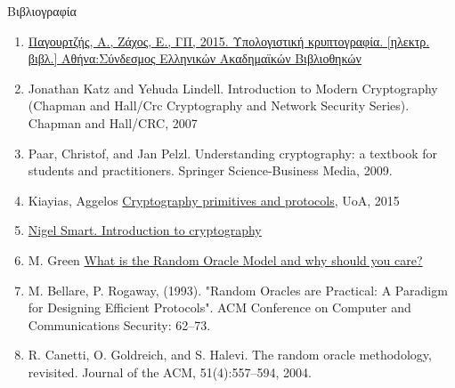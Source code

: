 \documentclass{beamer}
\begin{document}
\begin{frame}[allowframebreaks]{Βιβλιογραφία}

\begin{tiny}
\begin{enumerate}
\item \href{http://hdl.handle.net/11419/5439}{Παγουρτζής, Α., Ζάχος, Ε., ΓΠ, 2015. Υπολογιστική κρυπτογραφία. [ηλεκτρ. βιβλ.] Αθήνα:Σύνδεσμος Ελληνικών Ακαδημαϊκών Βιβλιοθηκών}
\item Jonathan Katz and Yehuda Lindell. Introduction to Modern Cryptography (Chapman and Hall/Crc Cryptography and Network Security Series). Chapman
and Hall/CRC, 2007
\item Paar, Christof, and Jan Pelzl. Understanding cryptography: a textbook for students and practitioners. Springer Science-Business Media, 2009.
\item Kiayias, Aggelos  \href{http://crypto.di.uoa.gr/class/Kryptographia/Semeioseis_files/Cryptograph_Primitives_and_Protocols.pdf}{Cryptography primitives and protocols}, UoA, 2015
\item \href{http://goo.gl/b75I29}{Nigel Smart. Introduction to cryptography} 
\medskip
\item M. Green \href{http://blog.cryptographyengineering.com/2011/09/what-is-random-oracle-model-and-why.html}{What is the Random Oracle Model and why should you care?}
\item M. Bellare, P. Rogaway, (1993). "Random Oracles are Practical: A Paradigm for Designing Efficient Protocols". ACM Conference on Computer and Communications Security: 62–73.
\item R. Canetti, O. Goldreich, and S. Halevi.  The random oracle methodology, revisited. Journal of the ACM, 51(4):557–594, 2004.
\end{enumerate}
\end{tiny}
\end{frame}
\end{document}
